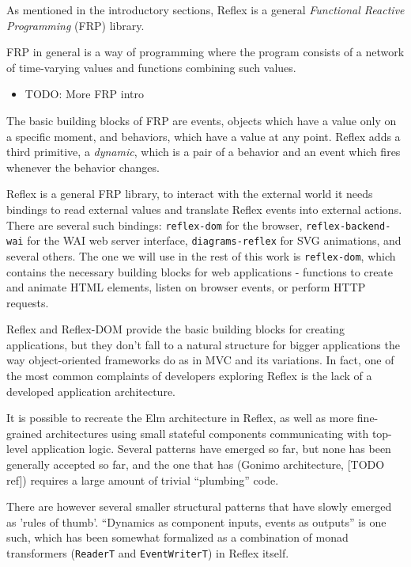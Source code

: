 \documentclass[english,odsaz]{fitthesis}
\begin{document}
As mentioned in the introductory sections, Reflex is a general \emph{Functional
Reactive Programming} (FRP) library.

FRP in general is a way of programming where the program consists of a network
of time-varying values and functions combining such values.

\begin{itemize}
\item TODO: More FRP intro
\end{itemize}

The basic building blocks of FRP are events, objects which have a value only on
a specific moment, and behaviors, which have a value at any point. Reflex adds
a third primitive, a \emph{dynamic}, which is a pair of a behavior and an event which
fires whenever the behavior changes.

Reflex is a general FRP library, to interact with the external world it needs
bindings to read external values and translate Reflex events into external
actions. There are several such bindings: \texttt{reflex-dom} for the browser,
\texttt{reflex-backend-wai} for the WAI web server interface, \texttt{diagrams-reflex} for SVG
animations, and several others. The one we will use in the rest of this work is
\texttt{reflex-dom}, which contains the necessary building blocks for web applications -
functions to create and animate HTML elements, listen on browser events, or
perform HTTP requests.

Reflex and Reflex-DOM provide the basic building blocks for creating
applications, but they don't fall to a natural structure for bigger applications
the way object-oriented frameworks do as in MVC and its variations. In fact, one
of the most common complaints of developers exploring Reflex is the lack of a
developed application architecture.

It is possible to recreate the Elm architecture in Reflex, as well as more
fine-grained architectures using small stateful components communicating with
top-level application logic. Several patterns have emerged so far, but none has
been generally accepted so far, and the one that has (Gonimo architecture, [TODO
ref]) requires a large amount of trivial ``plumbing'' code.

There are however several smaller structural patterns that have slowly emerged
as 'rules of thumb'. ``Dynamics as component inputs, events as outputs'' is one
such, which has been somewhat formalized as a combination of monad transformers
(\texttt{ReaderT} and \texttt{EventWriterT}) in Reflex itself.
\end{document}
